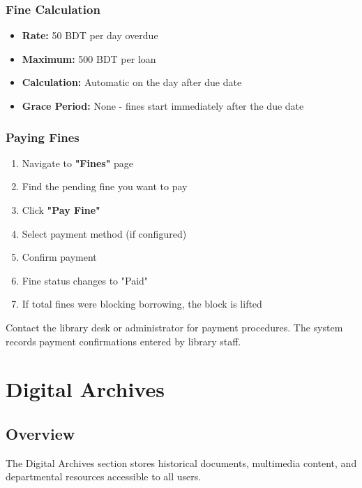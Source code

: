 \documentclass[12pt,a4paper]{article}
\begin{document}
\subsubsection{Fine Calculation}
\begin{itemize}[leftmargin=*]
    \item \textbf{Rate:} 50 BDT per day overdue
    \item \textbf{Maximum:} 500 BDT per loan
    \item \textbf{Calculation:} Automatic on the day after due date
    \item \textbf{Grace Period:} None - fines start immediately after the due date
\end{itemize}

\subsubsection{Paying Fines}
\begin{enumerate}[leftmargin=*]
    \item Navigate to \textbf{"Fines"} page
    \item Find the pending fine you want to pay
    \item Click \textbf{"Pay Fine"}
    \item Select payment method (if configured)
    \item Confirm payment
    \item Fine status changes to "Paid"
    \item If total fines were blocking borrowing, the block is lifted
\end{enumerate}

\begin{tcolorbox}[colback=yellow!10!white,colframe=orange,title=Payment Note]
Contact the library desk or administrator for payment procedures. The system records payment confirmations entered by library staff.
\end{tcolorbox}

\newpage

\section{Digital Archives}

\subsection{Overview}
The Digital Archives section stores historical documents, multimedia content, and departmental resources accessible to all users.
\end{document}
